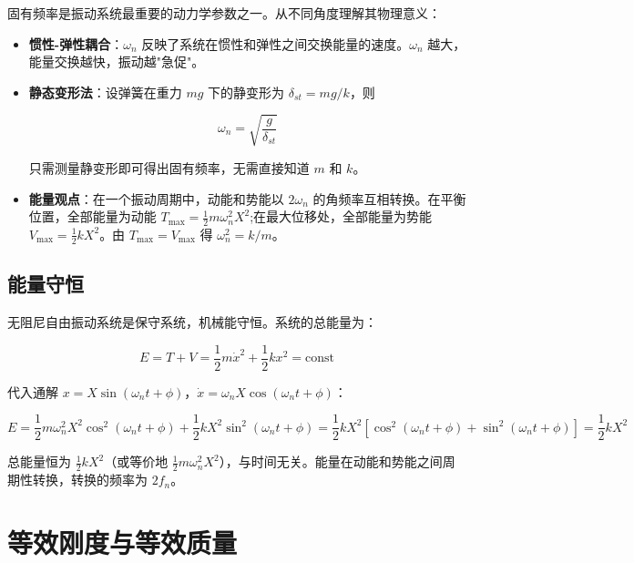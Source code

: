 固有频率是振动系统最重要的动力学参数之一。从不同角度理解其物理意义：

\begin{itemize}
    \item \textbf{惯性-弹性耦合}：$\omega_n$ 反映了系统在惯性和弹性之间交换能量的速度。$\omega_n$ 越大，能量交换越快，振动越"急促"。
    
    \item \textbf{静态变形法}：设弹簧在重力 $mg$ 下的静变形为 $\delta_{st} = mg/k$，则
    \begin{myformula}
        \[
        \omega_n = \sqrt{\frac{g}{\delta_{st}}}
        \]
    \end{myformula}
    只需测量静变形即可得出固有频率，无需直接知道 $m$ 和 $k$。
    
    \item \textbf{能量观点}：在一个振动周期中，动能和势能以 $2\omega_n$ 的角频率互相转换。在平衡位置，全部能量为动能 $T_{\max} = \frac{1}{2}m\omega_n^2X^2$;在最大位移处，全部能量为势能 $V_{\max} = \frac{1}{2}kX^2$。由 $T_{\max} = V_{\max}$ 得 $\omega_n^2 = k/m$。
\end{itemize}

\subsection{能量守恒}

无阻尼自由振动系统是保守系统，机械能守恒。系统的总能量为：
\begin{myformula}
    \[
    E = T + V = \frac{1}{2}m\dot{x}^2 + \frac{1}{2}kx^2 = \text{const}
    \]
\end{myformula}

代入通解 $x = X\sin(\omega_n t + \phi)$，$\dot{x} = \omega_n X\cos(\omega_n t + \phi)$：
\begin{myformula}
    \[
    E = \frac{1}{2}m\omega_n^2 X^2\cos^2(\omega_n t + \phi) + \frac{1}{2}kX^2\sin^2(\omega_n t + \phi)
      = \frac{1}{2}kX^2\left[\cos^2(\omega_n t + \phi) + \sin^2(\omega_n t + \phi)\right]
      = \frac{1}{2}kX^2
    \]
\end{myformula}

总能量恒为 $\frac{1}{2}kX^2$（或等价地 $\frac{1}{2}m\omega_n^2X^2$），与时间无关。能量在动能和势能之间周期性转换，转换的频率为 $2f_n$。

\section{等效刚度与等效质量}

